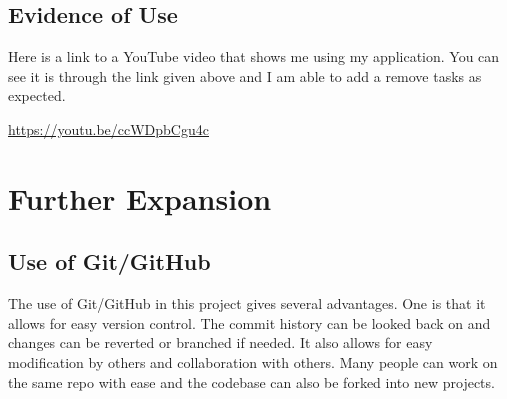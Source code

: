 \documentclass[12pt]{extarticle}
\begin{document}
\subsection{Evidence of Use}
Here is a link to a YouTube video that shows me using my application. You can see it is through the link given above and I am able to add a remove tasks as expected. 

\url{https://youtu.be/ccWDpbCgu4c}


\section{Further Expansion}
\subsection{Use of Git/GitHub}
The use of Git/GitHub in this project gives several advantages. One is that it allows for easy version control. The commit history can be looked back on and changes can be reverted or branched if needed. It also allows for easy modification by others and collaboration with others. Many people can work on the same repo with ease and the codebase can also be forked into new projects. 
\end{document}
